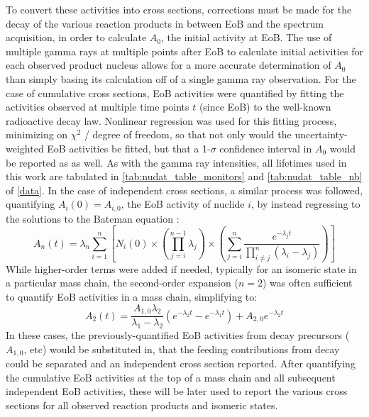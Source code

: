 \documentclass[3p]{elsarticle}
\newcommand{\pp}[1]{\left( #1\right)}
\begin{document}
To convert these activities into cross sections, corrections must be made for the decay of the various reaction products in  between EoB and the spectrum acquisition, in order to calculate $A_0$, the initial activity at EoB.
The use of  multiple gamma rays at multiple points after EoB to calculate initial activities  for each observed product nucleus allows for a more accurate  determination of $A_0$ than simply basing its calculation off of a single gamma ray observation.
For the case of cumulative cross sections, EoB activities were quantified by fitting the activities observed at multiple time points $t$ (since EoB) to the well-known radioactive decay law.
Nonlinear regression was used for this fitting process, minimizing on $\chi^2$ / degree of freedom, so that not only would the uncertainty-weighted EoB activities be fitted, but that a 1-$\sigma$ confidence interval in $A_0$ would be reported as as well.
As with the gamma ray intensities, all lifetimes used in this work are tabulated in \autoref{tab:nudat_table_monitors} and \autoref{tab:nudat_table_nb} of \ref{data}.
In the case of independent cross sections, a similar process was followed, quantifying $A_i\pp{0} = A_{i,0}$, the EoB activity of nuclide $i$, by instead regressing to the solutions to the Bateman equation \cite{bateman1910solution,Cetnar2006}:
\begin{equation}
A_n\pp{t} = \lambda_n \sum_{i=1}^n \left[  N_i\pp{0} \times \pp{\prod_{j=i}^{n-1}\lambda_j} \times \pp{\sum_{j=i}^n \dfrac{e^{-\lambda_j t}}{\prod_{i\neq j}^n \pp{\lambda_i - \lambda_j}}  }   \right]
\end{equation}
While higher-order terms were added if needed, typically for an isomeric state in a particular mass chain,  the second-order expansion ($n=2$) was often sufficient to quantify EoB activities in a mass chain, simplifying to:
\begin{equation}
A_2\pp{t} = \dfrac{A_{1,0}\lambda_2}{\lambda_1 - \lambda_2} \pp{e^{-\lambda_2 t} - e^{-\lambda_1 t}} + A_{2,0} e^{-\lambda_2 t}
\end{equation}
In these cases, the previously-quantified EoB activities from decay precursors ($A_{1,0}$, etc) would be substituted in, that the feeding contributions from decay could be separated and an independent cross section reported.
After quantifying the cumulative EoB activities at the top of a mass chain and all subsequent independent EoB activities, these will be later used to report the various cross sections for all observed reaction products and isomeric states. 
\end{document}
